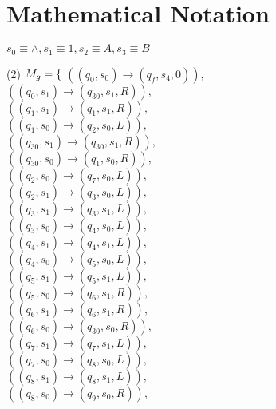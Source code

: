 \documentclass{article} %
\begin{document}
        \section{Mathematical Notation}
        $s_0 \equiv \land, s_1 \equiv 1, s_2 \equiv A, s_3 \equiv B$\\
        \begin{center}
            \begin{varwidth}{\textwidth}
            \begin{tasks}[label={},label-width={1cm}] (2)
                \task
                $M_g = \{\\$
                $((q_{0}, s_{0}) \to (q_{f}, s_{4}, 0)),$\\
                $((q_{0}, s_{1}) \to (q_{30}, s_{1}, R)),$\\
                $((q_{1}, s_{1}) \to (q_{1}, s_{1}, R)),$\\
                $((q_{1}, s_{0}) \to (q_{2}, s_{0}, L)),$\\
                $((q_{30}, s_{1}) \to (q_{30}, s_{1}, R)),$\\
                $((q_{30}, s_{0}) \to (q_{1}, s_{0}, R)),$\\
                $((q_{2}, s_{0}) \to (q_{7},s_{0},L)),$\\
                $((q_{2}, s_{1}) \to (q_{3}, s_{0}, L)),$\\
                $((q_{3}, s_{1}) \to (q_{3}, s_{1}, L)),$\\
                $((q_{3}, s_{0}) \to (q_{4}, s_{0}, L)),$\\
                $((q_{4}, s_{1}) \to (q_{4}, s_{1}, L)),$\\
                $((q_{4}, s_{0}) \to (q_{5}, s_{0}, L)),$\\
                $((q_{5}, s_{1}) \to (q_{5}, s_{1}, L)),$\\
                $((q_{5}, s_{0}) \to (q_{6}, s_{1}, R)),$\\
                $((q_{6}, s_{1}) \to (q_{6}, s_{1}, R)),$\\
                $((q_{6}, s_{0}) \to (q_{30}, s_{0}, R)),$\\
                $((q_{7}, s_{1}) \to (q_{7}, s_{1}, L)),$\\
                $((q_{7}, s_{0}) \to (q_{8}, s_{0}, L)),$\\
                $((q_{8}, s_{1}) \to (q_{8}, s_{1}, L)),$\\
                $((q_{8}, s_{0}) \to (q_{9}, s_{0}, R)),$\\

\end{tasks}
\end{varwidth}
\end{center}
\end{document}
